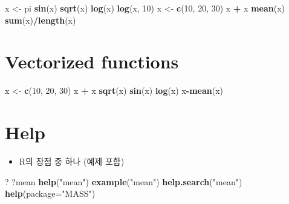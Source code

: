 \documentclass[]{book}
\newenvironment{Shaded}{\begin{snugshade}}{\end{snugshade}}
\newcommand{\KeywordTok}[1]{\textcolor[rgb]{0.13,0.29,0.53}{\textbf{#1}}}
\newcommand{\DataTypeTok}[1]{\textcolor[rgb]{0.13,0.29,0.53}{#1}}
\newcommand{\DecValTok}[1]{\textcolor[rgb]{0.00,0.00,0.81}{#1}}
\newcommand{\StringTok}[1]{\textcolor[rgb]{0.31,0.60,0.02}{#1}}
\newcommand{\OperatorTok}[1]{\textcolor[rgb]{0.81,0.36,0.00}{\textbf{#1}}}
\newcommand{\NormalTok}[1]{#1}
\providecommand{\tightlist}{%
  \setlength{\itemsep}{0pt}\setlength{\parskip}{0pt}}
\begin{document}
\begin{Shaded}
\begin{Highlighting}[]
\NormalTok{x <-}\StringTok{ }\NormalTok{pi}
\KeywordTok{sin}\NormalTok{(x)}
\KeywordTok{sqrt}\NormalTok{(x)}
\KeywordTok{log}\NormalTok{(x)}
\KeywordTok{log}\NormalTok{(x, }\DecValTok{10}\NormalTok{)}
\NormalTok{x <-}\StringTok{ }\KeywordTok{c}\NormalTok{(}\DecValTok{10}\NormalTok{, }\DecValTok{20}\NormalTok{, }\DecValTok{30}\NormalTok{)}
\NormalTok{x }\OperatorTok{+}\StringTok{ }\NormalTok{x}
\KeywordTok{mean}\NormalTok{(x)}
\KeywordTok{sum}\NormalTok{(x)}\OperatorTok{/}\KeywordTok{length}\NormalTok{(x)}
\end{Highlighting}
\end{Shaded}

\hypertarget{vectorized-functions}{%
\section{Vectorized functions}\label{vectorized-functions}}

\begin{Shaded}
\begin{Highlighting}[]
\NormalTok{x <-}\StringTok{ }\KeywordTok{c}\NormalTok{(}\DecValTok{10}\NormalTok{, }\DecValTok{20}\NormalTok{, }\DecValTok{30}\NormalTok{)}
\NormalTok{x }\OperatorTok{+}\StringTok{ }\NormalTok{x}
\KeywordTok{sqrt}\NormalTok{(x)}
\KeywordTok{sin}\NormalTok{(x)}
\KeywordTok{log}\NormalTok{(x)}
\NormalTok{x}\OperatorTok{-}\KeywordTok{mean}\NormalTok{(x)}
\end{Highlighting}
\end{Shaded}

\hypertarget{help}{%
\section{Help}\label{help}}

\begin{itemize}
\tightlist
\item
  R의 장점 중 하나 (예제 포함)
\end{itemize}

\begin{Shaded}
\begin{Highlighting}[]
\NormalTok{?}
\NormalTok{?mean}
\KeywordTok{help}\NormalTok{(}\StringTok{"mean"}\NormalTok{)}
\KeywordTok{example}\NormalTok{(}\StringTok{"mean"}\NormalTok{)}
\KeywordTok{help.search}\NormalTok{(}\StringTok{"mean"}\NormalTok{)}
\KeywordTok{help}\NormalTok{(}\DataTypeTok{package=}\StringTok{"MASS"}\NormalTok{)}
\end{Highlighting}
\end{Shaded}
\end{document}
